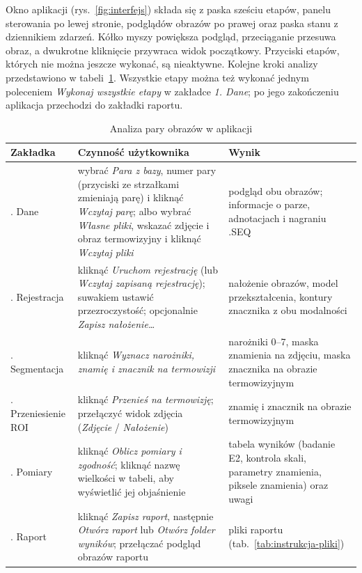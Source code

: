 Okno aplikacji (rys.~\ref{fig:interfejs}) składa się z paska sześciu etapów, panelu sterowania po lewej stronie, podglądów obrazów po prawej oraz paska stanu z dziennikiem zdarzeń. Kółko myszy powiększa podgląd, przeciąganie przesuwa obraz, a dwukrotne kliknięcie przywraca widok początkowy. Przyciski etapów, których nie można jeszcze wykonać, są nieaktywne. Kolejne kroki analizy przedstawiono w tabeli~\ref{tab:instrukcja-kroki}. Wszystkie etapy można też wykonać jednym poleceniem \emph{Wykonaj wszystkie etapy} w zakładce \emph{1. Dane}; po jego zakończeniu aplikacja przechodzi do zakładki raportu.

\begin{table}[!ht]
  \centering
  \caption{Analiza pary obrazów w aplikacji}
  \label{tab:instrukcja-kroki}
  \footnotesize
  \begin{tabularx}{\textwidth}{>{\raggedright\arraybackslash}p{2.3cm} X X}
    \toprule
    Zakładka & Czynność użytkownika & Wynik \\
    \midrule
    1. Dane & wybrać \emph{Para z bazy}, numer pary (przyciski ze strzałkami zmieniają parę) i kliknąć \emph{Wczytaj parę}; albo wybrać \emph{Własne pliki}, wskazać zdjęcie i obraz termowizyjny i kliknąć \emph{Wczytaj pliki} & podgląd obu obrazów; informacje o parze, adnotacjach i nagraniu .SEQ \\
    2. Rejestracja & kliknąć \emph{Uruchom rejestrację} (lub \emph{Wczytaj zapisaną rejestrację}); suwakiem ustawić przezroczystość; opcjonalnie \emph{Zapisz nałożenie\ldots} & nałożenie obrazów, model przekształcenia, kontury znacznika z obu modalności \\
    3. Segmentacja & kliknąć \emph{Wyznacz narożniki, znamię i znacznik na termowizji} & narożniki 0--7, maska znamienia na zdjęciu, maska znacznika na obrazie termowizyjnym \\
    4. Przeniesienie ROI & kliknąć \emph{Przenieś na termowizję}; przełączyć widok zdjęcia (\emph{Zdjęcie} / \emph{Nałożenie}) & znamię i znacznik na obrazie termowizyjnym \\
    5. Pomiary & kliknąć \emph{Oblicz pomiary i zgodność}; kliknąć nazwę wielkości w tabeli, aby wyświetlić jej objaśnienie & tabela wyników (badanie E2, kontrola skali, parametry znamienia, piksele znamienia) oraz uwagi \\
    6. Raport & kliknąć \emph{Zapisz raport}, następnie \emph{Otwórz raport} lub \emph{Otwórz folder wyników}; przełączać podgląd obrazów raportu & pliki raportu (tab.~\ref{tab:instrukcja-pliki}) \\
    \bottomrule
  \end{tabularx}
\end{table}

